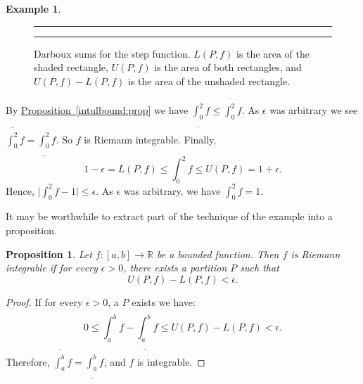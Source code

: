\documentclass[12pt]{book}
\newenvironment{myfigureht}{%
\begin{figure}[h!t]
\noindent\rule{\textwidth}{0.4pt}\vspace{12pt}\par\centering}%
{\par\noindent\rule{\textwidth}{0.4pt}
\end{figure}}
\newcommand{\R}{{\mathbb{R}}}
\theoremstyle{plain}
\newtheorem{prop}[thm]{Proposition}
\theoremstyle{remark}
\theoremstyle{definition}
\theoremstyle{exercise}
\theoremstyle{example}
\newtheorem{example}[thm]{Example}
\newcommand{\propref}[1]{\hyperref[#1]{Proposition~\ref*{#1}}}
\begin{document}
\begin{example}
\begin{myfigureht}
\caption{Darboux sums for the step function.  $L(P,f)$ is the area of the
shaded rectangle, $U(P,f)$ is the area of both rectangles, and
$U(P,f)-L(P,f)$ is the area of the unshaded rectangle.\label{darbouxfigstep}}
\end{myfigureht}
By \propref{intulbound:prop} we have $\underline{\int_0^2} f \leq \overline{\int_0^2} f$.
As $\epsilon$ was arbitrary we see 
$\overline{\int_0^2} f = \underline{\int_0^2} f$.  So $f$ is Riemann
integrable.  Finally,
\begin{equation*}
1-\epsilon = L(P,f) \leq \int_0^2 f \leq U(P,f) =
1+\epsilon.
\end{equation*}
Hence, $\bigl\lvert \int_0^2 f - 1 \bigr\rvert \leq \epsilon$.  As $\epsilon$ was arbitrary,
we have $\int_0^2 f = 1$.
\end{example}

It may be worthwhile to extract part of the technique of the example into a
proposition.

\begin{prop}
Let $f \colon [a,b] \to \R$ be a bounded function.  Then $f$ is Riemann
integrable if for every $\epsilon > 0$, there exists a partition $P$ such that
\begin{equation*}
U(P,f) - L(P,f) < \epsilon .
\end{equation*}
\end{prop}

\begin{proof}
If for every $\epsilon > 0$, a $P$ exists we have:
\begin{equation*}
0 \leq
\overline{\int_a^b} f - 
\underline{\int_a^b} f
\leq
U(P,f) - L(P,f) < \epsilon .
\end{equation*}
Therefore, 
$\overline{\int_a^b} f = \underline{\int_a^b} f$, and $f$ is integrable.
\end{proof}
\end{document}
